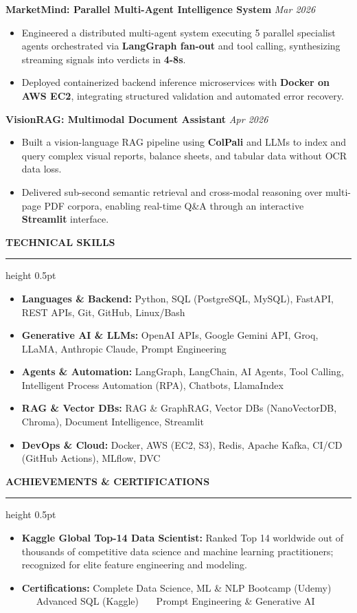\documentclass[10pt,letterpaper]{article}
\newcommand{\resumesection}[1]{%
  \vspace{3.5pt}%
  {\fontsize{10.5pt}{12pt}\selectfont\textbf{\MakeUppercase{#1}}}%
  \vspace{1.5pt}%
  \hrule height 0.5pt%
  \vspace{2.5pt}%
}
\begin{document}
\vspace{2pt}
\noindent\textbf{MarketMind: Parallel Multi-Agent Intelligence System} \hfill \textit{Mar 2026}
\begin{itemize}
  \item Engineered a distributed multi-agent system executing 5 parallel specialist agents orchestrated via \textbf{LangGraph fan-out} and tool calling, synthesizing streaming signals into verdicts in \textbf{4-8s}.
  \item Deployed containerized backend inference microservices with \textbf{Docker on AWS EC2}, integrating structured validation and automated error recovery.
\end{itemize}

\vspace{2pt}
\noindent\textbf{VisionRAG: Multimodal Document Assistant} \hfill \textit{Apr 2026}
\begin{itemize}
  \item Built a vision-language RAG pipeline using \textbf{ColPali} and LLMs to index and query complex visual reports, balance sheets, and tabular data without OCR data loss.
  \item Delivered sub-second semantic retrieval and cross-modal reasoning over multi-page PDF corpora, enabling real-time Q\&A through an interactive \textbf{Streamlit} interface.
\end{itemize}

\resumesection{Technical Skills}
\begin{itemize}[leftmargin=0pt, label={}]
  \item \textbf{Languages \& Backend:} Python, SQL (PostgreSQL, MySQL), FastAPI, REST APIs, Git, GitHub, Linux/Bash
  \item \textbf{Generative AI \& LLMs:} OpenAI APIs, Google Gemini API, Groq, LLaMA, Anthropic Claude, Prompt Engineering
  \item \textbf{Agents \& Automation:} LangGraph, LangChain, AI Agents, Tool Calling, Intelligent Process Automation (RPA), Chatbots, LlamaIndex
  \item \textbf{RAG \& Vector DBs:} RAG \& GraphRAG, Vector DBs (NanoVectorDB, Chroma), Document Intelligence, Streamlit
  \item \textbf{DevOps \& Cloud:} Docker, AWS (EC2, S3), Redis, Apache Kafka, CI/CD (GitHub Actions), MLflow, DVC
\end{itemize}

\resumesection{Achievements \& Certifications}
\begin{itemize}
  \item \textbf{Kaggle Global Top-14 Data Scientist:} Ranked Top 14 worldwide out of thousands of competitive data science and machine learning practitioners; recognized for elite feature engineering and modeling.
  \item \textbf{Certifications:} Complete Data Science, ML \& NLP Bootcamp (Udemy) \ \textbar\ \ Advanced SQL (Kaggle) \ \textbar\ \ Prompt Engineering \& Generative AI
\end{itemize}
\end{document}
